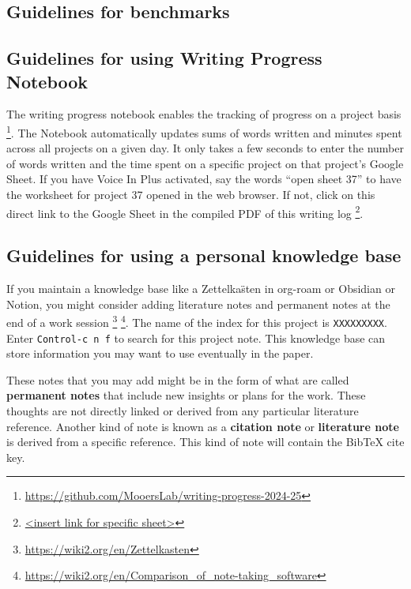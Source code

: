 \documentclass[10pt,letterpaper]{article}
\begin{document}
\subsection{Guidelines for benchmarks}
\label{subsec:guides:benchmarks}


\subsection{Guidelines for using Writing Progress Notebook}
\label{subsec:guides:wpnb}

The writing progress notebook enables the tracking of progress on a project basis \footnote{\url{https://github.com/MooersLab/writing-progress-2024-25}}.
The Notebook automatically updates sums of words written and minutes spent across all projects on a given day.
It only takes a few seconds to enter the number of words written and the time spent on a specific project on that project's Google Sheet. 
If you have Voice In Plus activated, say the words ``open sheet 37'' to have the worksheet for project 37 opened in the web browser.
If not, click on this direct link to the Google Sheet in the compiled PDF of this writing log \footnote{\url{<insert link for specific sheet>}}.




\subsection{Guidelines for using a personal knowledge base}
\label{subsec:guides:knowledgebase}

If you maintain a knowledge base like a Zettelka\"sten  in org-roam or Obsidian or Notion, you might consider adding literature notes and permanent notes at the end of a work session \footnote{\url{https://wiki2.org/en/Zettelkasten}} \footnote{\url{https://wiki2.org/en/Comparison_of_note-taking_software}}.
The name of the index for this project is \verb|XXXXXXXXX|.
Enter \texttt{Control-c n f} to search for this project note.
This knowledge base can store information you may want to use eventually in the paper.

These notes that you may add might be in the form of what are called \textbf{permanent notes} that include new insights or plans for the work.
These thoughts are not directly linked or derived from any particular literature reference.
Another kind of note is known as a \textbf{citation note} or \textbf{literature note} is derived from a specific reference.
This kind of note will contain the BibTeX cite key.
\end{document}

